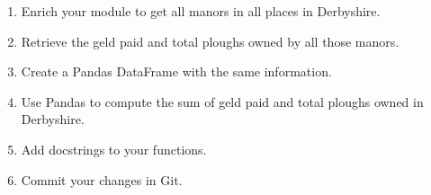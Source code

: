 \begin{enumerate}
    \item Enrich your module to get all manors in all places in Derbyshire.
    \item Retrieve the geld paid and total ploughs owned by all those manors.
    \item Create a Pandas DataFrame with the same information.
    \item Use Pandas to compute the sum of geld paid and total ploughs owned in Derbyshire.
    \item Add docstrings to your functions.
    \item Commit your changes in Git.
\end{enumerate}

\ifdefined\answer
\inputminted[]{python}{TD4_Python_Linux_similarities_answers_python_full.py}
\fi

